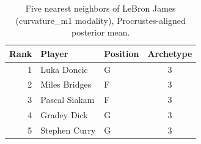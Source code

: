 \begin{table}[htbp]
  \centering\small
  \begin{tabular}{rllc}
    \toprule
    Rank & Player & Position & Archetype \\
    \midrule
    1 & Luka Doncic & G & 3 \\
    2 & Miles Bridges & F & 3 \\
    3 & Pascal Siakam & F & 3 \\
    4 & Gradey Dick & G & 3 \\
    5 & Stephen Curry & G & 3 \\
    \bottomrule
  \end{tabular}
  \caption{Five nearest neighbors of LeBron James (curvature_m1 modality), Procrustes-aligned posterior mean.}
  \label{tab:LeBron_James_neighbors_curvature_m1}
\end{table}

